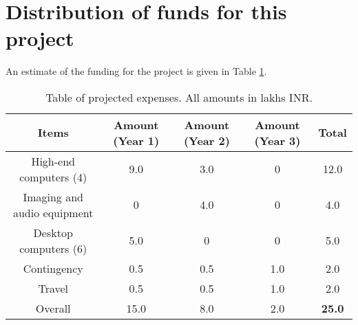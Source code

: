 \documentclass{article}
\begin{document}
\section{Distribution of funds for this project}

An estimate of the funding for the project is given in Table \ref{tab:funding}.

\begin{table}[th]
\centering
\caption{Table of projected expenses. All amounts in lakhs INR.}
\begin{tabular}{|c|c|c|c|c|}
\hline
Items & Amount (Year 1) & Amount (Year 2) & Amount (Year 3) & Total\\
\hline
High-end computers (4) & 9.0 & 3.0 & 0 & 12.0\\
Imaging and audio equipment & 0 & 4.0 & 0 & 4.0 \\
Desktop computers (6) & 5.0 & 0 & 0 & 5.0  \\
Contingency & 0.5 & 0.5 & 1.0 & 2.0 \\
Travel & 0.5 & 0.5 & 1.0 & 2.0\\
\hline
Overall & 15.0 & 8.0 & 2.0 & \textbf{25.0} \\
\hline
\end{tabular}
\label{tab:funding}
\end{table}
\end{document}
